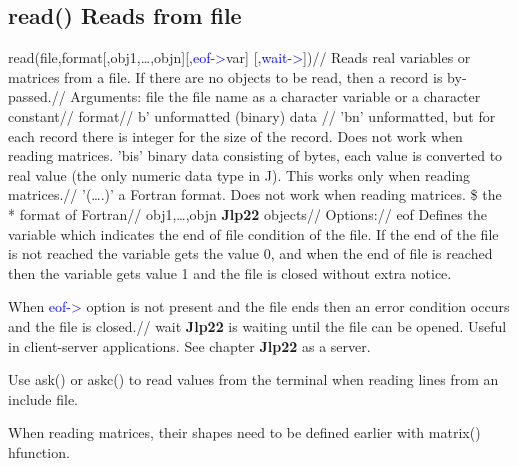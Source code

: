 \subsection{\textcolor{VioletRed}{read}() Reads from file}
\label{read}
\textcolor{VioletRed}{read}(file,format[,obj1,…,objn][,\textcolor{blue}{eof->}var] [,\textcolor{blue}{wait->}])//
Reads real variables or matrices from a file. If there are no objects
to be read, then a record is
by-passed.//
Arguments:
file the file name as a character variable or a character constant//
format//
b' unformatted (binary) data //
'bn' unformatted, but for each record there is integer for the size of the record. Does
not work when reading matrices.
'bis' binary data consisting of bytes, each value is converted to real value (the only
numeric data type in J). This works only when reading matrices.//
'(….)' a Fortran format. Does not work when reading matrices.
\$ the * format of Fortran//
obj1,…,objn
\textbf{Jlp22} objects//
Options://
eof Defines the variable which indicates the end of file condition of the file. If the end
of the file is not reached the variable gets the value 0, and when the end of file is
reached then the variable gets value 1 and the file is closed without extra notice.

When \textcolor{blue}{eof->} option is not present and the file ends then an error
condition occurs and the file is closed.//
wait \textbf{Jlp22} is waiting until the file can be opened. Useful in client-server applications. See
chapter \textbf{Jlp22} as a server.
\begin{note}
Use \textcolor{VioletRed}{ask}() or \textcolor{VioletRed}{askc}() to read values from the terminal when reading lines from an
include file.
\end{note}
\begin{note}
When reading matrices, their shapes need to
be defined earlier with \textcolor{VioletRed}{matrix}()
hfunction.
\end{note}
